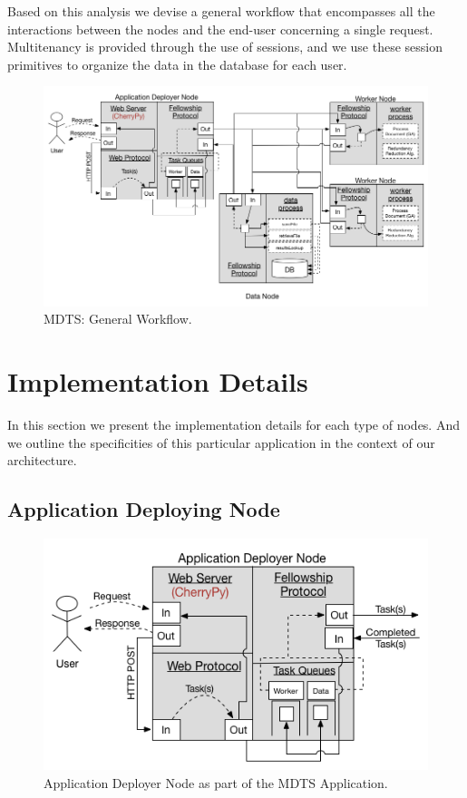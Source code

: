 \documentclass[12pt, titlepage]{uo_temp}
\begin{document}
     Based on this analysis we devise a general workflow that encompasses all the
     interactions between the nodes and the end-user concerning a single
     request. Multitenancy is provided through the use of sessions, and we use these
     session primitives to organize the data in the database for each user.
     
     \begin{figure}[h!]
       \centering
       \includegraphics[width=150mm]{images/mdts_overview.png}
       \caption{MDTS: General Workflow.}
     \end{figure}

     
     \section{Implementation Details}
     In this section we present the implementation details for each type of nodes. And we
     outline the specificities of this particular application in the context of our
     architecture.

     \subsection{Application Deploying Node}
     \begin{figure}[h!]
       \centering
       \includegraphics[width=125mm]{images/mdts_app_dep.png}
       \caption{Application Deployer Node as part of the MDTS Application.}
     \end{figure}
     
\end{document}

